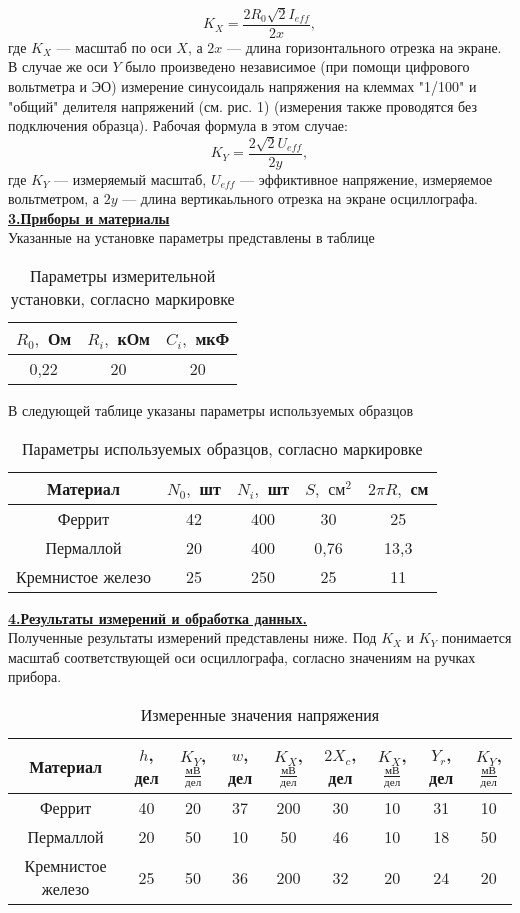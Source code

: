\documentclass[12pt, letterpaper, oneside]{article}
\begin{document}
\begin{equation}\label{K_X_formula}
K_X = \frac{2R_0\sqrt{2}I_{eff}}{2x},
\end{equation}
где $K_X$ — масштаб по оси $X$, а $2x$ — длина горизонтального отрезка на экране.
В случае же оси $Y$ было произведено независимое (при помощи цифрового вольтметра и ЭО) измерение синусоидаль напряжения на клеммах "1/100" и "общий" делителя напряжений (см. рис. 1) (измерения также проводятся без подключения образца). Рабочая формула в этом случае:
\begin{equation}\label{K_X_formula}
K_Y = \frac{2\sqrt{2}U_{eff}}{2y},
\end{equation}
где $K_Y$ — измеряемый масштаб, $U_{eff}$ — эффиктивное напряжение, измеряемое вольтметром, а $2y$ — длина вертикаьльного отрезка на экране осциллографа.\\
\textbf{\underline{3.Приборы и материалы}}\\
Указанные на установке параметры представлены в таблице\\
\begin{table}[H]
\centering
\caption{Параметры измерительной установки, согласно маркировке}
\begin{tabular}{|c|c|c|}
\hline
$R_0,$ Ом & $R_i,$ кОм & $C_i,$ мкФ\\
\hline
0,22 & 20 & 20\\
\hline
\end{tabular}
\end{table}
В следующей таблице указаны параметры используемых образцов\\
\begin{table}[H]
\centering
\caption{Параметры используемых образцов, согласно маркировке}
\begin{tabular}{|c|c|c|c|c|}
\hline
Материал & $N_0,$ шт & $N_i,$ шт & $S,$ $см^2$ & $2\pi R,$ см\\
\hline
Феррит & 42 & 400 & 30 & 25\\
\hline
Пермаллой & 20 & 400 & 0,76 & 13,3\\
\hline
Кремнистое железо & 25 & 250 & 25 & 11\\
\hline
\end{tabular}
\end{table}
\noindent\textbf{\underline{4.Результаты измерений и обработка данных.}}\\
Полученные результаты измерений представлены ниже. Под $K_X$ и $K_Y$ понимается масштаб соответствующей оси осциллографа, согласно значениям на ручках прибора.
\begin{table}[H]
\centering
\caption{Измеренные значения напряжения}
\begin{tabular}{|c|c|c||c|c||c|c||c|c|}
\hline
Материал & $h$, дел & $K_Y$, $\frac{мВ}{дел}$ & $w$, дел & $K_X$, $\frac{мВ}{дел}$ & $2X_c$, дел & $K_X$, $\frac{мВ}{дел}$ & $Y_r$, дел & $K_Y$, $\frac{мВ}{дел}$\\
\hline
Феррит & 40 & 20 & 37 & 200 & 30 & 10 & 31 & 10\\
\hline
Пермаллой & 20 & 50 & 10 & 50 & 46 & 10 & 18 & 50\\
\hline
Кремнистое железо & 25 & 50 & 36 & 200 & 32 & 20 & 24 & 20\\
\hline
\end{tabular}
\end{table}
\end{document}
